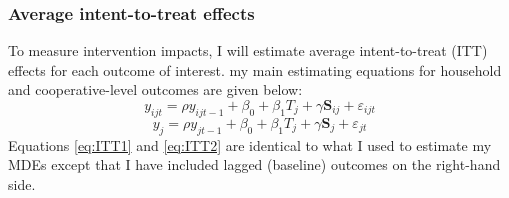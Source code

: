\documentclass[11pt]{article}
\begin{document}
\subsubsection{Average intent-to-treat effects}
To measure intervention impacts, I will estimate average intent-to-treat (ITT) effects for each outcome of interest. my main estimating equations for household and cooperative-level outcomes are given below:
\begin{equation} \label{eq:ITT1}
y_{ijt} = \rho y_{ijt-1} + \beta_{0} + \beta_{1} T_{j} + \gamma \textbf{S}_{ij} + \varepsilon_{ijt}
\end{equation}
\begin{equation} \label{eq:ITT2}
y_{j} = \rho y_{jt-1} + \beta_{0} + \beta_{1} T_{j} + \gamma \textbf{S}_{j} + \varepsilon_{jt}
\end{equation}
Equations \ref{eq:ITT1} and \ref{eq:ITT2} are identical to what I used to estimate my MDEs except that I have included lagged (baseline) outcomes on the right-hand side. 
\end{document}
